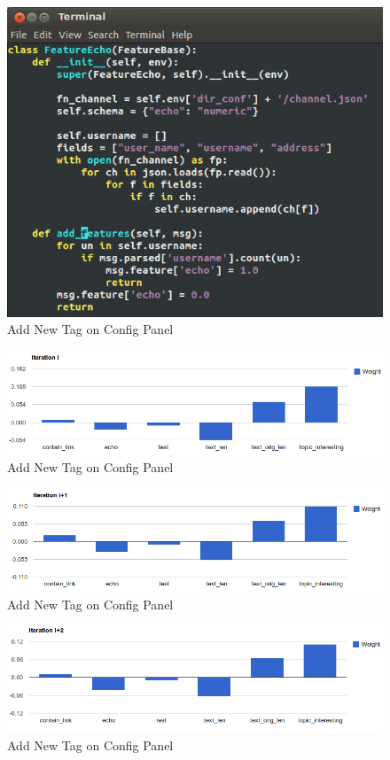 \documentclass{sig-alternate}
\begin{document}
\begin{figure}[h!]
	\centering
	\includegraphics[width=0.7\linewidth]{../pic/echo_feature.png}
	\caption{Add New Tag on Config Panel}
\end{figure}

\begin{figure}[h!]
	\centering
	\includegraphics[width=0.7\linewidth]{../pic/echo_gd_i.png}
	\caption{Add New Tag on Config Panel}
\end{figure}

\begin{figure}[h!]
	\centering
	\includegraphics[width=0.7\linewidth]{../pic/echo_gd_i1.png}
	\caption{Add New Tag on Config Panel}
\end{figure}

\begin{figure}[h!]
	\centering
	\includegraphics[width=0.7\linewidth]{../pic/echo_gd_i2.png}
	\caption{Add New Tag on Config Panel}
\end{figure}
\end{document}
